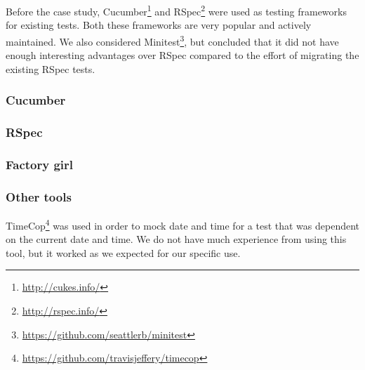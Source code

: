 
Before the case study, Cucumber\footnote{\url{http://cukes.info/}} and
RSpec\footnote{\url{http://rspec.info/}} were used as testing frameworks
for existing tests. Both these frameworks are very popular and actively
maintained. We also considered
Minitest\footnote{\url{https://github.com/seattlerb/minitest}}, but
concluded that it did not have enough interesting advantages over RSpec
compared to the effort of migrating the existing RSpec tests.\\

\subsubsection{Cucumber}


\subsubsection{RSpec}


\subsubsection{Factory girl}


\subsubsection{Other tools}

TimeCop\footnote{\url{https://github.com/travisjeffery/timecop}} was
used in order to mock date and time for a test that was dependent on the
current date and time. We do not have much experience from using this
tool, but it worked as we expected for our specific use.\\
